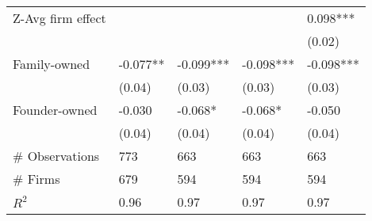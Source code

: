 \begin{tabular}{lllll}
Z-Avg firm effect                 &          &           &           & 0.098***  \\
                                  &          &           &           & (0.02)    \\
Family-owned                      & -0.077** & -0.099*** & -0.098*** & -0.098*** \\
                                  & (0.04)   & (0.03)    & (0.03)    & (0.03)    \\
Founder-owned                     & -0.030   & -0.068*   & -0.068*   & -0.050    \\
                                  & (0.04)   & (0.04)    & (0.04)    & (0.04)    \\
\# Observations                   & 773      & 663       & 663       & 663    \\
\# Firms                          & 679      & 594       & 594       & 594    \\
$R^2 $                            & 0.96     & 0.97      & 0.97      & 0.97      \\
\bottomrule
\end{tabular}

